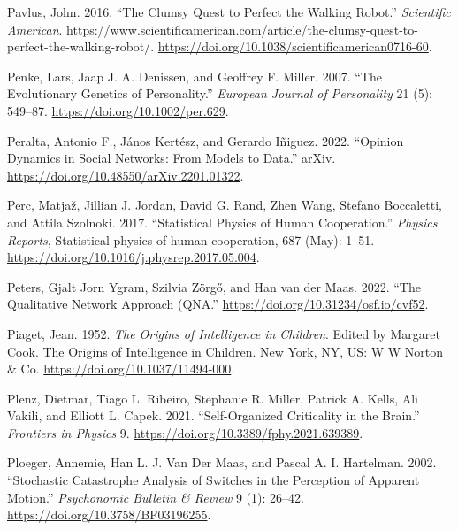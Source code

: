 \documentclass[
  a4paper,
  DIV=11,
  numbers=noendperiod]{scrreprt}
\newlength{\cslhangindent}
\newlength{\cslentryspacingunit} %
\newenvironment{CSLReferences}[2] %
 {%
  \setlength{\parindent}{0pt}
  \ifodd #1
  \let\oldpar\par
  \def\par{\hangindent=\cslhangindent\oldpar}
  \fi
  \setlength{\parskip}{#2\cslentryspacingunit}
 }%
 {}
\begin{document}
\begin{CSLReferences}{1}{0}
\leavevmode{}%
Pavlus, John. 2016. {``The {Clumsy Quest} to {Perfect} the {Walking
Robot}.''} \emph{Scientific American}.
https://www.scientificamerican.com/article/the-clumsy-quest-to-perfect-the-walking-robot/.
\url{https://doi.org/10.1038/scientificamerican0716-60}.

\leavevmode{}%
Penke, Lars, Jaap J. A. Denissen, and Geoffrey F. Miller. 2007. {``The
Evolutionary Genetics of Personality.''} \emph{European Journal of
Personality} 21 (5): 549--87. \url{https://doi.org/10.1002/per.629}.

\leavevmode{}%
Peralta, Antonio F., János Kertész, and Gerardo Iñiguez. 2022.
{``Opinion Dynamics in Social Networks: {From} Models to Data.''}
{arXiv}. \url{https://doi.org/10.48550/arXiv.2201.01322}.

\leavevmode{}%
Perc, Matjaž, Jillian J. Jordan, David G. Rand, Zhen Wang, Stefano
Boccaletti, and Attila Szolnoki. 2017. {``Statistical Physics of Human
Cooperation.''} \emph{Physics Reports}, Statistical physics of human
cooperation, 687 (May): 1--51.
\url{https://doi.org/10.1016/j.physrep.2017.05.004}.

\leavevmode{}%
Peters, Gjalt Jorn Ygram, Szilvia Zörgő, and Han van der Maas. 2022.
{``The {Qualitative Network Approach} ({QNA}.''}
\url{https://doi.org/10.31234/osf.io/cvf52}.

\leavevmode{}%
Piaget, Jean. 1952. \emph{The Origins of Intelligence in Children}.
Edited by Margaret Cook. The Origins of Intelligence in Children. {New
York, NY, US}: {W W Norton \& Co}.
\url{https://doi.org/10.1037/11494-000}.

\leavevmode{}%
Plenz, Dietmar, Tiago L. Ribeiro, Stephanie R. Miller, Patrick A. Kells,
Ali Vakili, and Elliott L. Capek. 2021. {``Self-{Organized Criticality}
in the {Brain}.''} \emph{Frontiers in Physics} 9.
\url{https://doi.org/10.3389/fphy.2021.639389}.

\leavevmode{}%
Ploeger, Annemie, Han L. J. Van Der Maas, and Pascal A. I. Hartelman.
2002. {``Stochastic Catastrophe Analysis of Switches in the Perception
of Apparent Motion.''} \emph{Psychonomic Bulletin \& Review} 9 (1):
26--42. \url{https://doi.org/10.3758/BF03196255}.


\end{CSLReferences}
\end{document}
